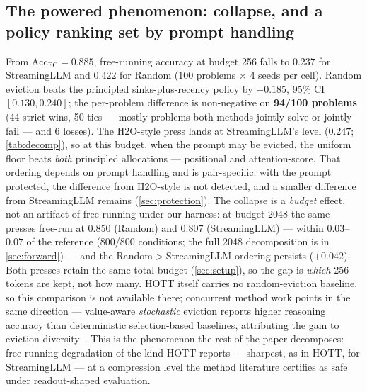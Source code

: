 \documentclass{article}
\newcommand{\accfc}{\mathrm{Acc}_{\mathrm{FC}}}
\begin{document}
\subsection{The powered phenomenon: collapse, and a policy ranking set by prompt handling}
\label{sec:phenomenon}
From $\accfc = 0.885$, free-running accuracy at budget 256 falls to $\mathbf{0.237}$ for StreamingLLM and $\mathbf{0.422}$ for Random (100 problems $\times$ 4 seeds per cell). Random eviction beats the principled sinks-plus-recency policy by $+0.185$, 95\% CI $[0.130, 0.240]$; the per-problem difference is non-negative on \textbf{94/100 problems} (44 strict wins, 50 ties --- mostly problems both methods jointly solve or jointly fail --- and 6 losses). The H2O-style press lands at StreamingLLM's level ($0.247$; \cref{tab:decomp}), so at this budget, when the prompt may be evicted, the uniform floor beats \emph{both} principled allocations --- positional and attention-score. That ordering depends on prompt handling and is pair-specific: with the prompt protected, the difference from H2O-style is not detected, and a smaller difference from StreamingLLM remains (\cref{sec:protection}). The collapse is a \emph{budget} effect, not an artifact of free-running under our harness: at budget 2048 the same presses free-run at $0.850$ (Random) and $0.807$ (StreamingLLM) --- within $0.03$--$0.07$ of the reference (800/800 conditions; the full 2048 decomposition is in \cref{sec:forward}) --- and the Random$>$StreamingLLM ordering persists ($+0.042$). Both presses retain the same total budget (\cref{sec:setup}), so the gap is \emph{which} 256 tokens are kept, not how many. HOTT itself carries no random-eviction baseline, so this comparison is not available there; concurrent method work points in the same direction --- value-aware \emph{stochastic} eviction reports higher reasoning accuracy than deterministic selection-based baselines, attributing the gain to eviction diversity~\citep{vase2026}. This is the phenomenon the rest of the paper decomposes: free-running degradation of the kind HOTT reports --- sharpest, as in HOTT, for StreamingLLM --- at a compression level the method literature certifies as safe under readout-shaped evaluation.
\end{document}
